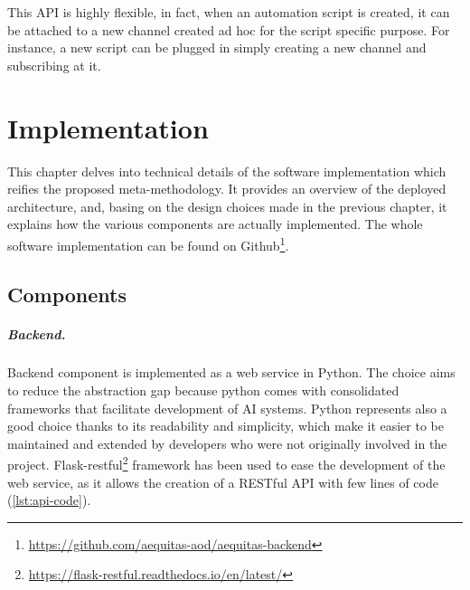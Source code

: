 \documentclass[12pt,a4paper,openright,twoside]{book}
\begin{document}
This API is highly flexible, in fact, when an automation script is created, it can be attached to a new channel created ad hoc for the script specific purpose.
%
For instance, a new script can be plugged in simply  creating a new channel and subscribing at it.




\chapter{Implementation}%
\label{chap:implementation}

This chapter delves into technical details of the software implementation which reifies the proposed meta-methodology.
%
It provides an overview of the deployed architecture, and, basing on the design choices made in the previous chapter, it explains how the various components are actually implemented.
%
The whole software implementation can be found on 
Github\footnote{\url{https://github.com/aequitas-aod/aequitas-backend}}.


\section{Components}


\paragraph{Backend.}


Backend component is implemented as a web service in Python. 
%
The choice aims to reduce the abstraction gap because python comes with consolidated frameworks that facilitate development of \ac{AI} systems.
%
Python represents also a good choice thanks to its readability and simplicity, which make it easier to be maintained and extended by developers who were not originally involved in the project.
%
Flask-restful\footnote{\url{https://flask-restful.readthedocs.io/en/latest/}} framework has been used to ease the development of the web service, as it allows the creation of a RESTful \ac{API} with few lines of code (\cref{lst:api-code}).



\end{document}
